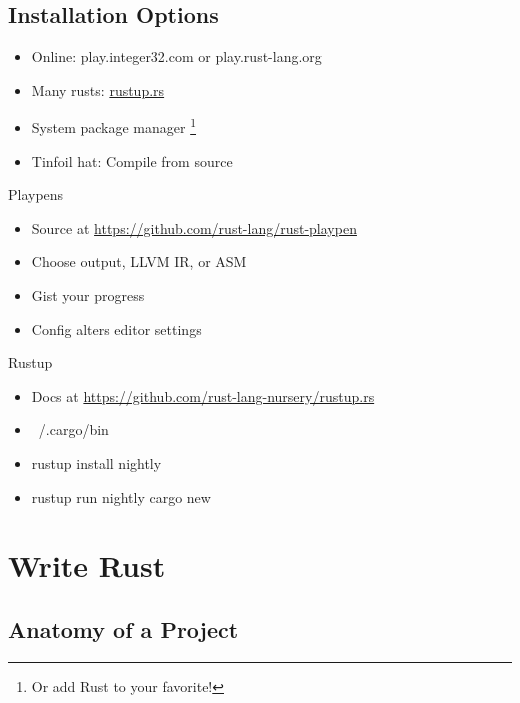 \documentclass[50pt]{beamer}
\begin{document}
    \subsection{Installation Options}

    \begin{frame}
        \begin{itemize}
            \item Online: play.integer32.com or play.rust-lang.org
            \item Many rusts: \url{rustup.rs}
            \item System package manager \footnote{Or add Rust to your favorite!}
            \item Tinfoil hat: Compile from source
        \end{itemize}
    \end{frame}

    \begin{frame}
        Playpens
        \begin{itemize}
            \item Source at \url{https://github.com/rust-lang/rust-playpen}
            \item Choose output, LLVM IR, or ASM
            \item Gist your progress
            \item Config alters editor settings
        \end{itemize}
    \end{frame}

    \begin{frame}
        Rustup
        \begin{itemize}
            \item Docs at \url{https://github.com/rust-lang-nursery/rustup.rs}
            \item ~/.cargo/bin
            \item rustup install nightly
            \item rustup run nightly cargo new
        \end{itemize}
    \end{frame}

\section{Write Rust}

\subsection{Anatomy of a Project}
\end{document}
